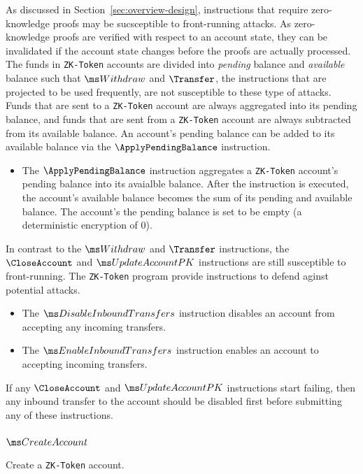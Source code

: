 \noindent
As discussed in Section~\ref{sec:overview-design}, instructions that require
zero-knowledge proofs may be sucsceptible to front-running attacks. As
zero-knowledge proofs are verified with respect to an account state, they can be
invalidated if the account state changes before the proofs are actually
processed. The funds in \texttt{ZK-Token} accounts are divided into
\emph{pending} balance and \emph{available} balance such that $\Withdraw$ and
$\Transfer$, the instructions that are projected to be used frequently, are not
susceptible to these type of attacks. Funds that are sent to a \texttt{ZK-Token}
account are always aggregated into its pending balance, and funds that are sent
from a \texttt{ZK-Token} account are always subtracted from its available
balance. An account's pending balance can be added to its available balance via
the $\ApplyPendingBalance$ instruction.
\begin{itemize}
  \item The $\ApplyPendingBalance$ instruction aggregates a \texttt{ZK-Token}
    account's pending balance into its avaialble balance. After the instruction
    is executed, the account's available balance becomes the sum of its pending
    and available balance. The account's the pending balance is set to be empty
    (a deterministic encryption of 0). 
\end{itemize}

\noindent
In contrast to the $\Withdraw$ and $\Transfer$ instructions, the $\CloseAccount$
and $\UpdateAccountPK$ instructions are still susceptible to front-running. The
\texttt{ZK-Token} program provide instructions to defend aginst potential
attacks.
\begin{itemize}
  \item The $\DisableInboundTransfers$ instruction disables an account from
    accepting any incoming transfers.

  \item The $\EnableInboundTransfers$ instruction enables an account to
    accepting incoming transfers.
\end{itemize}
If any $\CloseAccount$ and $\UpdateAccountPK$ instructions start failing, then
any inbound transfer to the account should be disabled first before submitting any
of these instructions.


\begingroup
\setlength{\parindent}{0em}
\setlength{\parskip}{0.75em}

\newpage
\subsubsection{$\CreateAccount$}
Create a \texttt{ZK-Token} account.

